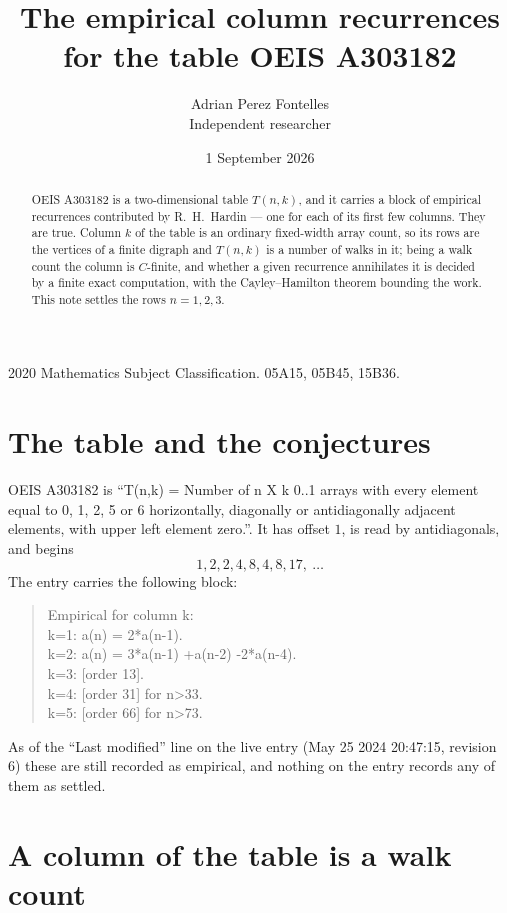 \documentclass[11pt,a4paper]{article}
\title{The empirical column recurrences for the table OEIS A303182}
\author{Adrian Perez Fontelles\\ \small Independent researcher}
\date{1 September 2026}
\theoremstyle{plain}
\theoremstyle{definition}
\begin{document}
\maketitle

\begin{abstract}
OEIS A303182 is a two-dimensional table $T(n,k)$, and it carries a block of empirical
recurrences contributed by R.~H.~Hardin --- one for each of its first few columns. They are
true. Column $k$ of the table is an ordinary fixed-width array count, so its rows are the
vertices of a finite digraph and $T(n,k)$ is a number of walks in it; being a walk count the
column is $C$-finite, and whether a given recurrence annihilates it is decided by a finite
exact computation, with the Cayley--Hamilton theorem bounding the work. This note settles the rows $n=1, 2, 3$.
\end{abstract}

\noindent\small 2020 Mathematics Subject Classification. 05A15, 05B45, 15B36.\normalsize

\section{The table and the conjectures}

OEIS A303182 is ``T(n,k) = Number of n X k 0..1 arrays with every element equal to 0, 1, 2, 5 or 6 horizontally, diagonally or antidiagonally adjacent elements, with upper left element zero.''. It has offset $1$, is
read by antidiagonals, and begins
\[
1, 2, 2, 4, 8, 4, 8, 17,\ \dots
\]
The entry carries the following block:
\begin{quote}\small
Empirical for column k:\\
k=1: a(n) = 2*a(n-1).\\
k=2: a(n) = 3*a(n-1) +a(n-2) -2*a(n-4).\\
k=3: [order 13].\\
k=4: [order 31] for n>33.\\
k=5: [order 66] for n>73.\\
\end{quote}
As of the ``Last modified'' line on the live entry (May 25 2024 20:47:15, revision 6) these are still
recorded as empirical, and nothing on the entry records any of them as settled.

\section{A column of the table is a walk count}
\end{document}
